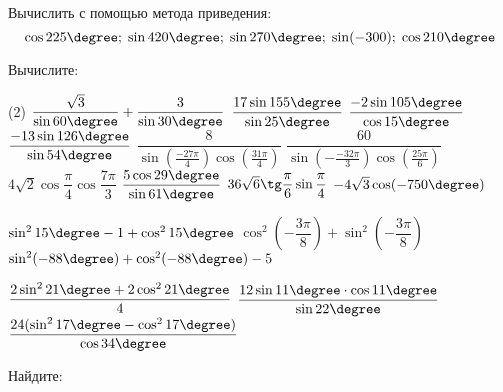 \begin{class}[number=2]
	\begin{listofex}
		\item Вычислить с помощью метода приведения: %
		\[ \cos 225 \degree;\;\sin 420 \degree;\;\sin 270 \degree;\;\sin (-300) ;\;\cos 210 \degree \]
		\item Вычислите: %
		\begin{tasks}(2)
			\task \( \dfrac{\sqrt{3}}{\sin60\degree}+\dfrac{3}{\sin30\degree} \)
			\task \( \dfrac{17\sin155\degree}{\sin25\degree} \)
			\task \( \dfrac{-2\sin105\degree}{\cos15\degree} \)
			\task \( \dfrac{-13\sin126\degree}{\sin54\degree} \)
			\task \( \dfrac{ 8 }{ \sin \left( \tfrac{ -27\pi }{ 4 } \right) \cos \left( \tfrac{ 31\pi }{ 4 } \right) } \)
			\task \( \dfrac{ 60 }{ \sin \left( -\tfrac{ -32\pi }{ 3 } \right) \cos \left( \tfrac{ 25\pi }{ 6 } \right)} \)
			\task \( 4 \sqrt{2} \cos \dfrac{ \pi }{ 4 } \cos \dfrac{ 7\pi }{3  } \)
			\task \( \dfrac{ 5 \cos 29 \degree }{ \sin 61 \degree } \)
			\task \( 36 \sqrt{6} \tg \dfrac{ \pi }{ 6 } \sin \dfrac{ \pi }{ 4 } \)
			\task \( -4 \sqrt{3} \cos (-750 \degree) \)
			
			\task \( \sin^215\degree-1+\cos^215 \degree \)
			\task \( \cos^2\left( -\dfrac{ 3\pi }{ 8 } \right) +\sin^2\left( -\dfrac{ 3\pi }{ 8 } \right) \)
			\task \( \sin^2 (-88\degree) + \cos^2 (-88\degree) -5 \)
			
			\task \( \dfrac{2\sin^221\degree+2\cos^221\degree}{4} \)
			\task \( \dfrac{ 12\sin 11 \degree \cdot \cos 11 \degree }{ \sin 22 \degree } \)
			\task \( \dfrac{ 24 (\sin^2 17 \degree-\cos^217 \degree) }{ \cos 34 \degree } \)
			
			
			
		\end{tasks}
		\item Найдите: %
		\begin{tasks}
			

\end{tasks}
\end{listofex}
\end{class}
